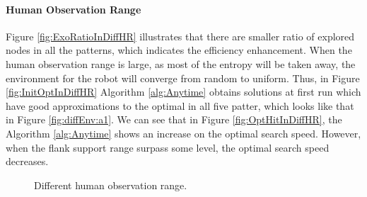 \documentclass[12pt]{article}
\begin{document}
\paragraph{Human Observation Range}

Figure \ref{fig:ExoRatioInDiffHR} illustrates that there are smaller ratio of explored nodes in all the patterns, which indicates the efficiency enhancement.
When the human observation range is large, as most of the entropy will be taken away, the environment for the robot will converge from random to uniform.
Thus, in Figure \ref{fig:InitOptInDiffHR} Algorithm \ref{alg:Anytime} obtains solutions at first run which have good approximations to the optimal in all five patter, which looks like that in Figure \ref{fig:diffEnv:a1}.
We can see that in Figure \ref{fig:OptHitInDiffHR}, the Algorithm \ref{alg:Anytime} shows an increase on the optimal search speed. 
However, when the flank support range surpass some level, the optimal search speed decreases.

\begin{figure}[H] 
  \centering 
  \caption{Different human observation range.} 
  \label{fig:PMdiffHR} %
\end{figure}
\end{document}
